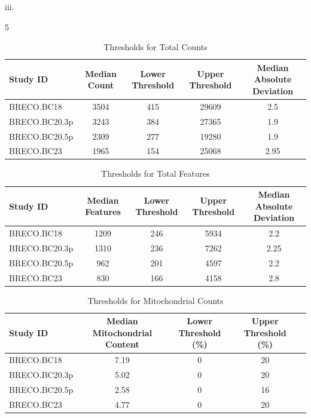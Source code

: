 iii. 

\begin{table}[ht]
	\centering
	\small
	\renewcommand{\arraystretch}{1.4}
	{\columnwidth}{5}
	\begin{tabular}{|l| c | c | c | c |}
		\hline
		Study ID	&	Median Count & Lower Threshold & Upper Threshold & Median Absolute Deviation \\
		\hline
		BRECO.BC18 		& 3504 & 415 & 29609 & 2.5 	\\
		
		BRECO.BC20.3p 	& 3243 & 384 & 27365 & 1.9 		\\
		
		BRECO.BC20.5p 	& 2309 & 277 & 19280 & 1.9 		\\
		
		BRECO.BC23 		& 1965 & 154 & 25068 & 2.95\\
		\hline
	\end{tabular}
	\caption{Thresholds for Total Counts}
	\label{tab: qc_thesholds_counts}
\end{table}


\begin{table}[ht]
	\centering
	\small
	\renewcommand{\arraystretch}{1.4}
	\begin{tabular}{| l | c | c | c | c |}
		\hline
		Study ID	&	Median Features & Lower Threshold & Upper Threshold & Median Absolute Deviation \\
		\hline
		BRECO.BC18 		& 1209 & 246 & 5934 & 2.2 	\\
		BRECO.BC20.3p 	& 1310 & 236 & 7262 & 2.25	\\
		BRECO.BC20.5p 	& 962  & 201 & 4597 & 2.2 	\\
		BRECO.BC23 		& 830  & 166 & 4158 & 2.8	\\
		\hline
	\end{tabular}
	\caption{Thresholds for Total Features}
	\label{tab: qc_thesholds_features}
\end{table}

\begin{table}
	\centering
	\small
	\renewcommand{\arraystretch}{1.4}
	\begin{tabular}{| l | c | c | c | c |}
		\hline
		Study ID & Median Mitochondrial Content & Lower Threshold (\%) & Upper Threshold (\%) \\
		\hline
		BRECO.BC18 		& 7.19 & 0 & 20 \\
		BRECO.BC20.3p 	& 5.02 & 0 & 20 \\
		BRECO.BC20.5p 	& 2.58 & 0 & 16 \\
		BRECO.BC23 		& 4.77 & 0 & 20 \\
		\hline
	\end{tabular}
	\caption{Thresholds for Mitochondrial Counts}
	\label{tab: qc_thesholds_mito_percent}
\end{table}




